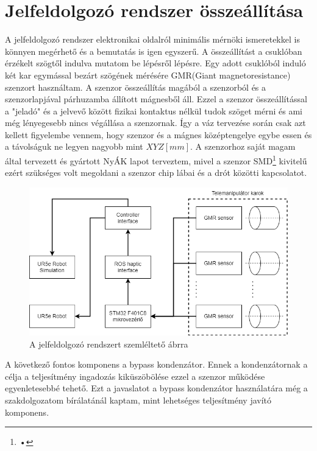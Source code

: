 \section{Jelfeldolgozó rendszer összeállítása}

A jelfeldolgozó rendszer elektronikai oldalról minimális mérnöki ismeretekkel is könnyen megérhető és a bemutatás is igen egyszerű. A összeállítást a csuklóban érzékelt szögtől indulva mutatom be lépésről lépésre. Egy adott csuklóból induló két kar egymással bezárt szögének mérésére GMR(Giant magnetoresistance) szenzort használtam. A szenzor összeállítás magából a szenzorból és a szenzorlapjával párhuzamba állított mágnesből áll. Ezzel a szenzor összeállítással a "jeladó" és a jelvevő között fizikai kontaktus nélkül tudok szöget mérni és ami még lényegesebb nincs végállása a szenzornak. Így a váz tervezése során csak azt kellett figyelembe vennem, hogy szenzor és a mágnes középtengelye egybe essen és a távolságuk ne legyen nagyobb mint $XYZ[mm]$. A szenzorhoz saját magam által tervezett és gyártott NyÁK lapot terveztem, mivel a szenzor SMD\footnote{•} kivitelű ezért szükséges volt megoldani a szenzor chip lábai és a drót közötti kapcsolatot.

\begin{figure}[!ht]
\centering
\includegraphics[width=125mm, keepaspectratio]{figures/Diagrammok/Telemanipulator_teljesrendszer}
\caption{A jelfeldolgozó rendszert szemléltető ábrra}
\label{fig:Telemanipulator_teljesrendszer}
\end{figure}

A következő fontos komponens a bypass kondenzátor. Ennek a kondenzátornak a célja a teljesítmény ingadozás kiküszöbölése ezzel a szenzor működése egyenletesebbé tehető. Ezt a javaslatot a bypass kondenzátor használatára még a szakdolgozatom bírálatánál kaptam, mint lehetséges teljesítmény javító komponens.

